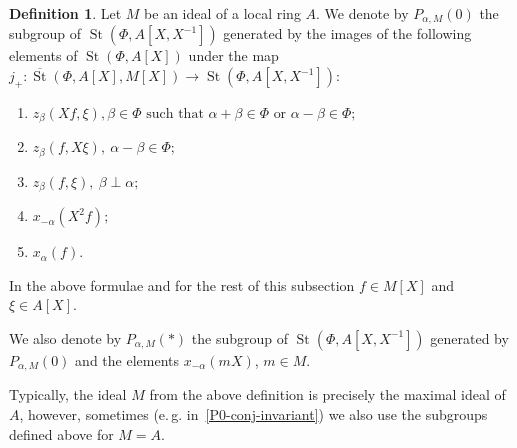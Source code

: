 \documentclass[oneside, 8pt]{amsart}
\theoremstyle{remark}
\theoremstyle{definition}
\newtheorem{df}[lemma]{Definition} \Crefname{df}{Definition}{Definitions}
\DeclareMathOperator{\St}{St}
\numberwithin{equation}{section}
\begin{document}
\begin{df} \label{defP0}
Let $M$ be an ideal of a local ring $A$. We denote by $P_{\alpha, M}(0)$ the subgroup of $\St(\Phi, A[X, X^{-1}])$ generated by the images of the following elements of $\St(\Phi, A[X])$ under the
 map $j_+ \colon \overline{\St}(\Phi, A[X], M[X]) \to \St(\Phi, A[X, X^{-1}])$:
\begin{enumerate} \item $z_{\beta}(Xf, \xi), \beta \in \Phi \text{ such that }\alpha + \beta \in \Phi\text{ or } \alpha - \beta \in \Phi;$
 \item $z_{\beta}(f, X\xi),\ \alpha - \beta \in \Phi;$
 \item $z_{\beta}(f, \xi),\ \beta \perp \alpha;$
 \item $x_{-\alpha}(X^2f);$
 \item $x_{\alpha}(f)$. \end{enumerate}
In the above formulae and for the rest of this subsection $f \in M[X]$ and $\xi \in A[X]$. 

We also denote by $P_{\alpha, M}(*)$ the subgroup of $\St(\Phi, A[X, X^{-1}])$ generated by $P_{\alpha, M}(0)$ and the elements $x_{-\alpha}(mX)$, $m \in M$.
\end{df}

Typically, the ideal $M$ from the above definition is precisely the maximal ideal of $A$, however, sometimes (e.\,g. in~\cref{P0-conj-invariant}) we also use the subgroups defined above for $M=A$.
\end{document}
